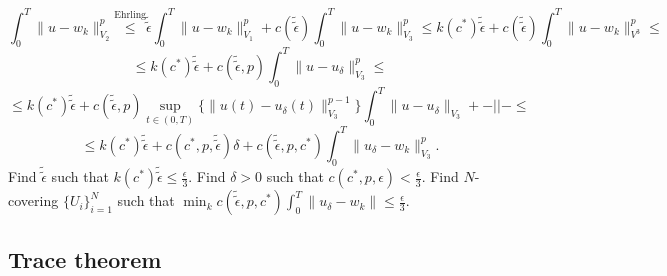 \documentclass[12pt]{article}					%
\begin{document}
\begin{dukaz}
	\begin{dukazin}[3.]
		$$ \int_0^T \|u - w_k\|_{V_2}^p \overset{\text{Ehrling}}≤ \tilde{\tilde \epsilon} \int_0^T \|u - w_k\|_{V_1}^p + c(\tilde{\tilde \epsilon}) \int_0^T \|u - w_k\|_{V_3}^p ≤ k(c^*) \tilde{\tilde\epsilon} + c(\tilde{\tilde\epsilon}) \int_0^T \|u - w_k\|_{V^3}^p ≤ $$
		$$ ≤ k(c^*) \tilde{\tilde\epsilon} + c(\tilde{\tilde\epsilon}, p) \int_0^T \|u - u_\delta\|_{V_3}^p ≤ $$
		$$ ≤ k(c^*) \tilde{\tilde\epsilon} + c(\tilde{\tilde\epsilon}, p) \sup_{t \in (0, T)}\{\|u(t) - u_\delta(t)\|_{V_3}^{p - 1}\} \int_0^T \|u - u_\delta\|_{V_3} + -||- ≤ $$
		$$ ≤ k(c^*) \tilde{\tilde\epsilon} + c(c^*, p, \tilde{\tilde\epsilon}) \delta + c(\tilde{\tilde\epsilon}, p, c^*) \int_0^T \|u_\delta - w_k\|_{V_3}^p. $$
		Find $\tilde{\tilde\epsilon}$ such that $k(c^*) \tilde{\tilde\epsilon} ≤ \frac{\epsilon}{3}$. Find $\delta > 0$ such that $c(c^*, p, \epsilon) < \frac{\epsilon}{3}$. Find $N$-covering $\{U_i\}_{i=1}^N$ such that $\min_k c(\tilde{\tilde\epsilon}, p, c^*) \int_0^T \|u_\delta - w_k\| ≤ \frac{\epsilon}{3}$.
	\end{dukazin}
\end{dukaz}

\subsection{Trace theorem}
\end{document}

